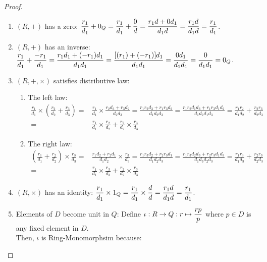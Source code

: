 \begin{proof}
\begin{enumerate}
        \item $(R, +)$ has a zero: $\displaystyle \frac{r_1}{d_1} + 0_Q = \frac{r_1}{d_1} + \frac{0}{d} = \frac{r_1 d + 0 d_1}{d_1 d} = \frac{r_1 d}{d_1 d} = \frac{r_1}{d_1}$.
        \item $(R, +)$ has an inverse: $\displaystyle \frac{r_1}{d_1} + \frac{-r_1}{d_1} = \frac{r_1d_1 + (-r_1)d_1}{d_1 d_1} = \frac{[(r_1) + (-r_1)]d_1}{d_1 d_1} = \frac{0 d_1}{d_1 d_1} = \frac{0}{d_1 d_1} = 0_Q$.
        \item $(R, +, \times)$ satisfies distributive law:
        \begin{enumerate}[label=\theenumi-\arabic*.]
            \item The left law:
            \begin{align*}
                \frac{r_1}{d_1} \times \left( \frac{r_2}{d_2} + \frac{r_3}{d_3} \right)
            = &\frac{r_1}{d_1} \times \frac{r_2 d_3 + r_3 d_2}{d_2 d_3}
            = \frac{r_1 r_2 d_3 + r_1 r_3 d_2}{d_1 d_2 d_3}
            = \frac{r_1 r_2 d_1 d_3 + r_1 r_3 d_1 d_2}{d_1 d_2 d_1 d_3}
            = \frac{r_1 r_2}{d_1 d_2} + \frac{r_2 r_3}{d_2 d_3} \\
            = &\frac{r_1}{d_1} \times \frac{r_2}{d_2} + \frac{r_2}{d_2} \times \frac{r_3}{d_3}
            \end{align*}
            \item The right law:
            \begin{align*}
                \left(\frac{r_1}{d_1} + \frac{r_2}{d_2}\right) \times \frac{r_3}{d_3}
            = &\frac{r_1 d_2 + r_2 d_1}{d_1 d_2} \times \frac{r_3}{d_3}
            = \frac{r_1 r_3 d_2 + r_2 r_3 d_1}{d_1 d_2 d_3}
            = \frac{r_1 r_3 d_2 d_3 + r_2 r_3 d_1 d_3}{d_1 d_3 d_2 d_3}
            = \frac{r_1 r_3}{d_1 d_3} + \frac{r_2 r_3}{d_2 d_3} \\
            = &\frac{r_1}{d_1} \times \frac{r_3}{d_3} + \frac{r_2}{d_2} \times \frac{r_3}{d_3}
            \end{align*}
        \end{enumerate}
        \item $(R, \times)$ has an identity: $\displaystyle \frac{r_1}{d_1} \times 1_Q = \frac{r_1}{d_1} \times \frac{d}{d} = \frac{r_1d}{d_1d} = \frac{r_1}{d_1}$.
        \item Elements of $D$ become unit in $Q$: Define $\iota:R \to Q:r \mapsto \displaystyle \frac{rp}{p}$ where $p \in D$ is any fixed element in $D$. \\
        Then, $\iota$ is Ring-Monomorphsim because:
        \begin{enumerate}[label=\theenumi-\arabic*.]

\end{enumerate}
\end{enumerate}
\end{proof}

